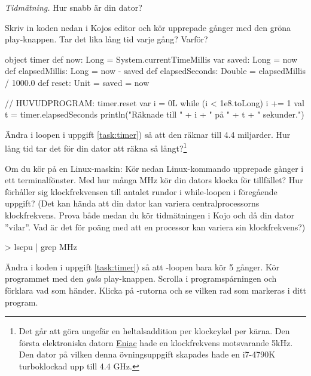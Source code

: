 \Task \label{task:measuretime} \emph{Tidmätning.} Hur snabb är din dator?

\Subtask \label{task:timer} Skriv in koden nedan i Kojos editor och kör upprepade gånger med den gröna play-knappen. Tar det lika lång tid varje gång? Varför?

\begin{Code}
object timer {
  def now: Long = System.currentTimeMillis
  var saved: Long = now
  def elapsedMillis: Long = now - saved
  def elapsedSeconds: Double = elapsedMillis / 1000.0
  def reset: Unit = { saved = now }
}

// HUVUDPROGRAM:
timer.reset
var i = 0L
while (i < 1e8.toLong) { i += 1 }
val t = timer.elapsedSeconds
println("Räknade till " + i + " på " + t + " sekunder.")
\end{Code}


\Subtask Ändra i loopen i uppgift \ref{task:timer}) så att den räknar till 4.4 miljarder. Hur lång tid tar det för din dator att räkna så långt?\footnote{Det går att göra ungefär en heltalsaddition per klockcykel per kärna. Den första elektroniska datorn \href{https://sv.wikipedia.org/wiki/ENIAC}{Eniac} hade en klockfrekvens motsvarande 5kHz. Den dator på vilken denna övningsuppgift skapades hade en i7-4790K turboklockad upp till 4.4 GHz.
}

\Subtask  Om du kör på en Linux-maskin: Kör nedan Linux-kommando upprepade gånger i ett terminalfönster. Med hur många MHz kör din dators klocka för tillfället? Hur förhåller sig klockfrekvensen till antalet rundor i while-loopen i föregående uppgift? (Det kan hända att din dator kan variera centralprocessorns klockfrekvens. Prova både medan du kör tidmätningen i Kojo och då din dator ''vilar''. Vad är det för poäng med att en processor kan variera sin klockfrekvens?)
\begin{REPLnonum}
> lscpu | grep MHz
\end{REPLnonum}


\Subtask Ändra i koden i uppgift \ref{task:timer}) så att -loopen bara kör 5 gånger. Kör programmet med den \emph{gula} play-knappen. Scrolla i programspårningen och förklara vad som händer. Klicka på -rutorna och se vilken rad som markeras i ditt program.

